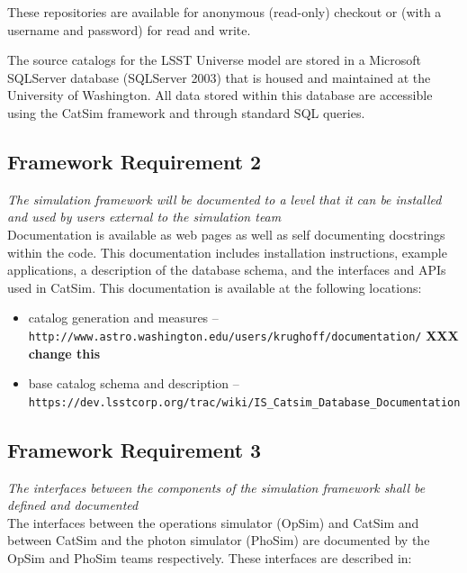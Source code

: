 \documentclass[]{article}
\begin{document}
These repositories are available for anonymous (read-only) checkout or
(with a username and password) for read and write.

The source catalogs for the LSST Universe model are stored in a
Microsoft SQLServer database (SQLServer 2003) that is housed and
maintained at the University of Washington. All data stored within
this database are accessible using the CatSim framework and through
standard SQL queries.

\subsection{Framework Requirement 2}

{\it The simulation framework will be documented to a level
  that it can be installed and used by users external to the
  simulation team}\\

Documentation is available as web pages as well as self documenting
docstrings within the code.  This documentation includes installation
instructions, example applications, a description of the database
schema, and the interfaces and APIs used in CatSim. This documentation
is available at the following locations:
\begin{itemize}
\item catalog generation and measures -- {\tt http://www.astro.washington.edu/users/krughoff/documentation/}
{\bf XXX change this}

\item base catalog schema and description -- {\tt https://dev.lsstcorp.org/trac/wiki/IS\_Catsim\_Database\_Documentation}
\end{itemize}


\subsection{Framework Requirement 3}

{\it  The interfaces between the components of the simulation framework shall be defined 
and documented}\\

The interfaces between the operations simulator (OpSim) and CatSim and
between CatSim and the photon simulator (PhoSim) are documented by the
OpSim and PhoSim teams respectively.  These interfaces are described in:
\end{document}
